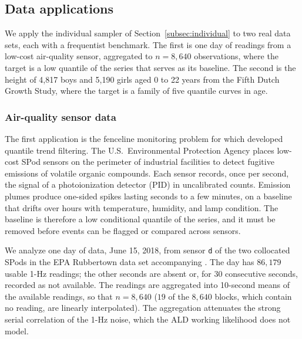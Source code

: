 \subsection{Data applications}
\label{sec:applications}

We apply the individual sampler of Section~\ref{subsec:individual} to two real data sets, each with a frequentist benchmark. The first is one day of readings from a low-cost air-quality sensor, aggregated to $n = 8{,}640$ observations, where the target is a low quantile of the series that serves as its baseline. The second is the height of 4{,}817 boys and 5{,}190 girls aged 0 to 22 years from the Fifth Dutch Growth Study, where the target is a family of five quantile curves in age.

\subsubsection{Air-quality sensor data}
\label{sec:app:spod}

The first application is the fenceline monitoring problem for which \citet{brantley2020baseline} developed quantile trend filtering. The U.S.\ Environmental Protection Agency places low-cost SPod sensors on the perimeter of industrial facilities to detect fugitive emissions of volatile organic compounds. Each sensor records, once per second, the signal of a photoionization detector (PID) in uncalibrated counts. Emission plumes produce one-sided spikes lasting seconds to a few minutes, on a baseline that drifts over hours with temperature, humidity, and lamp condition. The baseline is therefore a low conditional quantile of the series, and it must be removed before events can be flagged or compared across sensors.

We analyze one day of data, June 15, 2018, from sensor \texttt{d} of the two collocated SPods in the EPA Rubbertown data set accompanying \citet{brantley2020baseline}. The day has $86{,}179$ usable 1-Hz readings; the other seconds are absent or, for $30$ consecutive seconds, recorded as not available. The readings are aggregated into 10-second means of the available readings, so that $n = 8{,}640$ ($19$ of the $8{,}640$ blocks, which contain no reading, are linearly interpolated). The aggregation attenuates the strong serial correlation of the 1-Hz noise, which the ALD working likelihood does not model.

